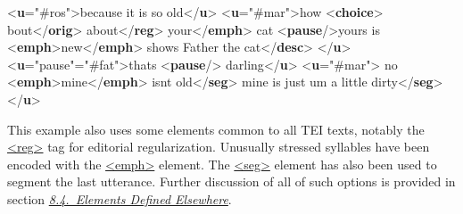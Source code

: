 \begin{shaded}
{<\textbf{u}\hspace*{1em}{who}="{\#ros}">}because it is so old{</\textbf{u}>}\mbox{}\newline 
{<\textbf{u}\hspace*{1em}{who}="{\#mar}">}how {<\textbf{choice}>}\mbox{}\newline 
\hspace*{1em}bout{</\textbf{orig}>}\mbox{}\newline 
\hspace*{1em}about{</\textbf{reg}>}\mbox{}\newline 
{}\mbox{}\newline 
{}your{</\textbf{emph}>} cat {<\textbf{pause}/>}yours is {<\textbf{emph}>}new{</\textbf{emph}>}\mbox{}\newline 
{}\mbox{}\newline 
\hspace*{1em}shows Father the cat{</\textbf{desc}>}\mbox{}\newline 
{}\mbox{}\newline 
{</\textbf{u}>}\mbox{}\newline 
{<\textbf{u}\hspace*{1em}{trans}="{pause}"\hspace*{1em}{who}="{\#fat}">}thats {<\textbf{pause}/>} darling{</\textbf{u}>}\mbox{}\newline 
{<\textbf{u}\hspace*{1em}{who}="{\#mar}">}\mbox{}\newline 
{}no {<\textbf{emph}>}mine{</\textbf{emph}>} isnt old{</\textbf{seg}>}\mbox{}\newline 
{}mine is just um a little dirty{</\textbf{seg}>}\mbox{}\newline 
{</\textbf{u}>}\end{shaded}\egroup\par \noindent  \par
This example also uses some elements common to all TEI texts, notably the \hyperref[TEI.reg]{<reg>} tag for editorial regularization. Unusually stressed syllables have been encoded with the \hyperref[TEI.emph]{<emph>} element. The \hyperref[TEI.seg]{<seg>} element has also been used to segment the last utterance. Further discussion of all of such options is provided in section \textit{\hyperref[TSSA]{8.4.\ Elements Defined Elsewhere}}.\par
